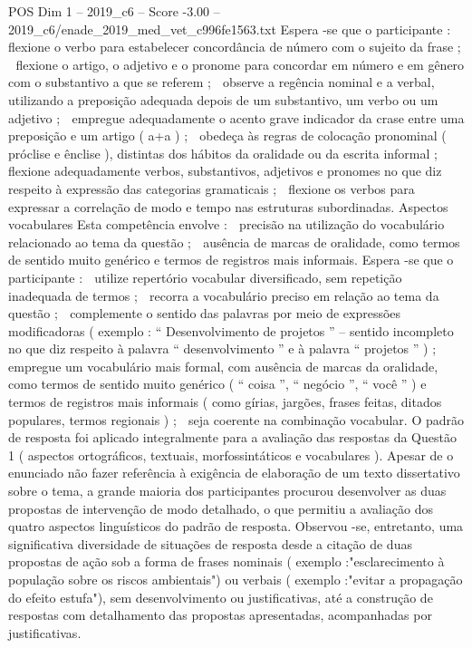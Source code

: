 \begin{textsample}{POS Dim 1 – 2019\_c6 – Score -3.00 – 2019\_c6/enade\_2019\_med\_vet\_c996fe1563.txt}
Espera -se que o participante :  flexione o verbo para estabelecer concordância de número com o sujeito da frase ;  flexione o artigo, o adjetivo e o pronome para concordar em número e em gênero com o substantivo a que se referem ;  observe a regência nominal e a verbal, utilizando a preposição adequada depois de um substantivo, um verbo ou um adjetivo ;  empregue adequadamente o acento grave indicador da crase entre uma preposição e um artigo ( a+a ) ;  obedeça às regras de colocação pronominal ( próclise e ênclise ), distintas dos hábitos da oralidade ou da escrita informal ;  flexione adequadamente verbos, substantivos, adjetivos e pronomes no que diz respeito à expressão das categorias gramaticais ;  flexione os verbos para expressar a correlação de modo e tempo nas estruturas subordinadas.
Aspectos vocabulares Esta competência envolve :  precisão na utilização do vocabulário relacionado ao tema da questão ;  ausência de marcas de oralidade, como termos de sentido muito genérico e termos de registros mais informais.
Espera -se que o participante :  utilize repertório vocabular diversificado, sem repetição inadequada de termos ;  recorra a vocabulário preciso em relação ao tema da questão ;  complemente o sentido das palavras por meio de expressões modificadoras ( exemplo : “ Desenvolvimento de projetos ” – sentido incompleto no que diz respeito à palavra “ desenvolvimento ” e à palavra “ projetos ” ) ;  empregue um vocabulário mais formal, com ausência de marcas da oralidade, como termos de sentido muito genérico ( “ coisa ”, “ negócio ”, “ você ” ) e termos de registros mais informais ( como gírias, jargões, frases feitas, ditados populares, termos regionais ) ;  seja coerente na combinação vocabular.
O padrão de resposta foi aplicado integralmente para a avaliação das respostas da Questão 1 ( aspectos ortográficos, textuais, morfossintáticos e vocabulares ).
Apesar de o enunciado não fazer referência à exigência de elaboração de um texto dissertativo sobre o tema, a grande maioria dos participantes procurou desenvolver as duas propostas de intervenção de modo detalhado, o que permitiu a avaliação dos quatro aspectos linguísticos do padrão de resposta.
Observou -se, entretanto, uma significativa diversidade de situações de resposta desde a citação de duas propostas de ação sob a forma de frases nominais ( exemplo :"esclarecimento à população sobre os riscos ambientais") ou verbais ( exemplo :"evitar a propagação do efeito estufa"), sem desenvolvimento ou justificativas, até a construção de respostas com detalhamento das propostas apresentadas, acompanhadas por justificativas.

\end{textsample}
